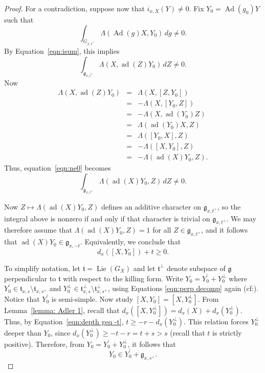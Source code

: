 \documentclass[11pt]{amsart}
\theoremstyle{definition}
\theoremstyle{remark}
\numberwithin{equation}{theorem}
\def\GF{{G}}
\def\gF{{\mathfrak{g}}}
\def\t{{\mathfrak{t}}}
\def\kill#1#2{{\Lambda\left({#1},{#2}\right)}}
\def\i{{i}}
\def\Ad{{\rm Ad}}
\def\ad{{\rm ad}}
\def\Lie{{\operatorname{Lie}}}
\def\Ad{\operatorname{Ad}}
\def\ad{\operatorname{ad}}
\begin{document}
\begin{proof}
For a contradiction, suppose now that $\i_{x,X}(Y) \ne 0$. Fix
$Y_0 = \Ad(g_0)Y$ such that
\begin{equation}
\int_{\GF_{x,t^+}} \kill{\Ad(g)X}{Y_0}\, dg \ne 0.
\end{equation}
By Equation~\ref{eqn:isum}, this implies
\begin{equation}\label{eqn:ne0}
\int_{\gF_{x,t^+}} \kill{X}{\ad(Z)Y_0}\, dZ\ne 0.
\end{equation}
Now
\begin{eqnarray*}
 \kill{X}{\ad(Z)Y_0}
    &=& \kill{X}{[Z,Y_0]}\\
    &=& -\kill{X}{[Y_0,Z]}\\
    &=& -\kill{X}{\ad(Y_0)Z}\\
    &=& \kill{\ad(Y_0)X}{Z}\\
    &=& \kill{[Y_0,X]}{Z}\\
    &=& -\kill{[X,Y_0]}{Z}\\
    &=& -\kill{\ad(X)Y_0}{Z}.
\end{eqnarray*}
Thus, equation~\ref{eqn:ne0} becomes
\begin{equation}\label{eqn:ne1}
\int_{\gF_{x,t^+}} \kill{\ad(X)Y_0}{Z}\, dZ \ne 0.
\end{equation}

Now $Z \mapsto \kill{\ad(X)Y_0}{Z}$ defines an additive character
on $\gF_{x,t^+}$, so the integral above is nonzero if and only if
that character is trivial on $\gF_{x,t^+}$. We may therefore
assume that $\kill{\ad(X)Y_0}{Z} =1$ for all $Z\in \gF_{x,t^+}$,
and it follows that $\ad(X)Y_0 \in \gF_{x,-t}$. Equivalently, we
conclude that
\begin{equation}\label{eqn:depth geq -t}
d_x([X,Y_0]) + t \geq 0.
\end{equation}

To simplify notation, let $\t = \Lie(\GF_X)$ and let $\t^\perp$
denote subspace of $\gF$ perpendicular to $\t$ with respect to the
killing form. Write $Y_0 = Y_0^{\prime} + Y_0^\perp$ where
$Y_0^{\prime} \in {\t}_{x,s} \setminus {\t}_{x,s^+}$ and
$Y_0^\perp \in {\t}_{x,s}^\perp \setminus {\t}_{x,s^+}^\perp$,
using Equations \ref{eqn:perp decomp} again
(cf:\cite[1.9.3]{Adler}). Notice that $Y_0^\prime$ is semi-simple.
Now study $[X,Y_0] = [X,Y_0^\perp]$. From Lemma~\ref{lemma: Adler
1}, recall that $d_x([X,Y_0^\perp]) = d_x(X) + d_x(Y_0^\perp)$.
Thus, by Equation~\ref{eqn:depth geq -t}, $t \geq -r
-d_x(Y_0^\perp)$. This relation forces $Y_0^\perp$ deeper than
$Y_0$, since $d_x(Y_0^\perp) \geq -t -r = t + s > s$ (recall that
$t$ is strictly positive). Therefore, from $Y_0 = Y_0^{\prime} +
Y_0^\perp$, it follows that
\begin{equation}
Y_0 \in  Y_0^\prime + \gF_{x,s^+}.
\end{equation}


\end{proof}
\end{document}
